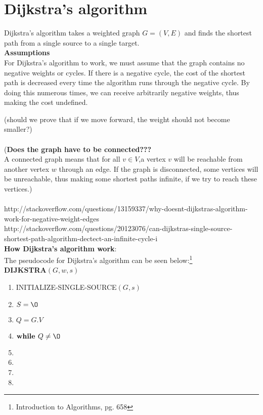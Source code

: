 \documentclass[11pt]{article}
\begin{document}
\section{Dijkstra's algorithm}
Dijkstra's algorithm takes a weighted graph $G = (V, E)$ and finds the shortest path from a single source to a single target.\\   

\noindent
\textbf{Assumptions}\\
For Dijkstra's algorithm to work, we must assume that the graph contains no negative weights or cycles. If there is a negative cycle, the cost of the shortest path is decreased every time the algorithm runs through the negative cycle. By doing this numerous times, we can receive arbitrarily negative weights, thus making the cost undefined. 

(should we prove that if we move forward, the weight should not become smaller?)\\\\

\noindent
(\textbf{Does the graph have to be connected???}\\
A connected graph means that for all $v \in V $,a vertex $v$ will be reachable from another vertex $w$ through an edge. If the graph is disconnected, some vertices will be unreachable, thus making some shortest paths infinite, if we try to reach these vertices.)\\\\

http://stackoverflow.com/questions/13159337/why-doesnt-dijkstras-algorithm-work-for-negative-weight-edges\\

http://stackoverflow.com/questions/20123076/can-dijkstras-single-source-shortest-path-algorithm-dectect-an-infinite-cycle-i\\

\noindent
\textbf{How Dijkstra's algorithm work}:\\
The pseudocode for Dijkstra's algorithm can be seen below:\footnote{Introduction to Algorithms, pg. 658}\\


\textbf{DIJKSTRA$(G, w, s)$}
\begin{enumerate}
\setlength\itemsep{0em}
\item INITIALIZE-SINGLE-SOURCE$(G, s)$
\item $S = \O$
\item $Q = G.V$
\item $\textbf{while } Q \neq \O$
\item {}
\item {}
\item {}
\item \tab{}
\end{enumerate}
\end{document}

